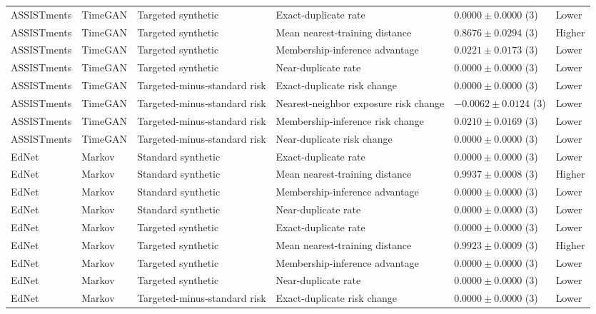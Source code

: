 \begin{longtable}{@{}p{2.25cm}p{2.05cm}p{4.7cm}p{5.0cm}p{2.6cm}p{1.25cm}@{}}
ASSISTments & TimeGAN & Targeted synthetic & Exact-duplicate rate & $0.0000 \mathbin{\pm} 0.0000$ (3) & Lower \\
ASSISTments & TimeGAN & Targeted synthetic & Mean nearest-training distance & $0.8676 \mathbin{\pm} 0.0294$ (3) & Higher \\
ASSISTments & TimeGAN & Targeted synthetic & Membership-inference advantage & $0.0221 \mathbin{\pm} 0.0173$ (3) & Lower \\
ASSISTments & TimeGAN & Targeted synthetic & Near-duplicate rate & $0.0000 \mathbin{\pm} 0.0000$ (3) & Lower \\
ASSISTments & TimeGAN & Targeted-minus-standard risk & Exact-duplicate risk change & $0.0000 \mathbin{\pm} 0.0000$ (3) & Lower \\
ASSISTments & TimeGAN & Targeted-minus-standard risk & Nearest-neighbor exposure risk change & $-0.0062 \mathbin{\pm} 0.0124$ (3) & Lower \\
ASSISTments & TimeGAN & Targeted-minus-standard risk & Membership-inference risk change & $0.0210 \mathbin{\pm} 0.0169$ (3) & Lower \\
ASSISTments & TimeGAN & Targeted-minus-standard risk & Near-duplicate risk change & $0.0000 \mathbin{\pm} 0.0000$ (3) & Lower \\
EdNet & Markov & Standard synthetic & Exact-duplicate rate & $0.0000 \mathbin{\pm} 0.0000$ (3) & Lower \\
EdNet & Markov & Standard synthetic & Mean nearest-training distance & $0.9937 \mathbin{\pm} 0.0008$ (3) & Higher \\
EdNet & Markov & Standard synthetic & Membership-inference advantage & $0.0000 \mathbin{\pm} 0.0000$ (3) & Lower \\
EdNet & Markov & Standard synthetic & Near-duplicate rate & $0.0000 \mathbin{\pm} 0.0000$ (3) & Lower \\
EdNet & Markov & Targeted synthetic & Exact-duplicate rate & $0.0000 \mathbin{\pm} 0.0000$ (3) & Lower \\
EdNet & Markov & Targeted synthetic & Mean nearest-training distance & $0.9923 \mathbin{\pm} 0.0009$ (3) & Higher \\
EdNet & Markov & Targeted synthetic & Membership-inference advantage & $0.0000 \mathbin{\pm} 0.0000$ (3) & Lower \\
EdNet & Markov & Targeted synthetic & Near-duplicate rate & $0.0000 \mathbin{\pm} 0.0000$ (3) & Lower \\
EdNet & Markov & Targeted-minus-standard risk & Exact-duplicate risk change & $0.0000 \mathbin{\pm} 0.0000$ (3) & Lower \\

\end{longtable}
